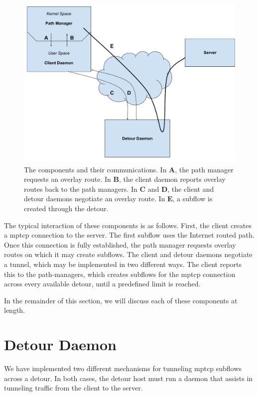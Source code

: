 \documentclass{cwru}
\begin{document}
\begin{figure}[h]
  \centering
  \includegraphics[width=\textwidth]{figures/MovingParts.pdf}
  \caption[Interaction of client, detour, and server]{
    The components and their communications. In \textbf{A}, the path manager
    requests an overlay route. In \textbf{B}, the client daemon reports overlay
    routes back to the path managers. In \textbf{C} and \textbf{D}, the client
    and detour daemons negotiate an overlay route. In \textbf{E}, a subflow is
    created through the detour.
  }
  \label{f:MovingParts}
\end{figure}

The typical interaction of these components is as follows. First, the client
creates a \ac{mptcp} connection to the server. The first subflow uses the Internet
routed path. Once this connection is fully established, the path manager
requests overlay routes on which it may create subflows. The client and detour
daemons negotiate a tunnel, which may be implemented in two different ways. The
client reports this to the path-managers, which creates subflows for the \ac{mptcp}
connection across every available detour, until a predefined limit is reached.

In the remainder of this section, we will discuss each of these components at
length.

\section{Detour Daemon}

We have implemented two different mechanisms for tunneling \ac{mptcp} subflows across
a detour. In both cases, the detour host must run a daemon that assists in
tunneling traffic from the client to the server.
\end{document}
